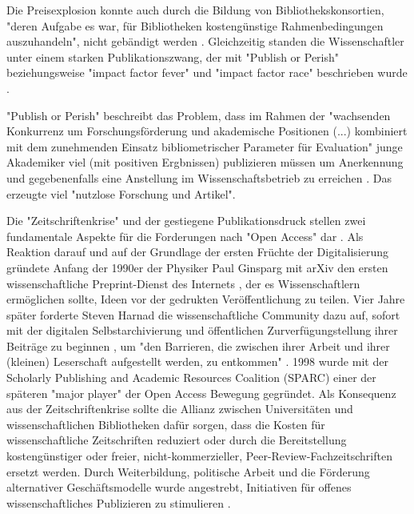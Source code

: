 Die Preisexplosion konnte auch durch die Bildung von Bibliothekskonsortien, "deren Aufgabe es war, für Bibliotheken kostengünstige Rahmenbedingungen auszuhandeln", nicht gebändigt werden \cite{Fladung_2003} \cite{Brintzinger_2010}. Gleichzeitig standen die Wissenschaftler unter einem starken Publikationszwang, der mit "Publish or Perish" \cite{CLAPHAM_2005} beziehungsweise "impact factor fever" \cite{Cherubini_2008} und "impact factor race" \cite{Brischoux_2009} beschrieben wurde \cite{offhaus_2012_institutionelle_repos}.  

"Publish or Perish" beschreibt das Problem, dass im Rahmen der "wachsenden Konkurrenz um Forschungsförderung und akademische Positionen (...) kombiniert mit dem zunehmenden Einsatz bibliometrischer Parameter für Evaluation" \cite{Fanelli_2010} junge Akademiker viel (mit positiven Ergbnissen) publizieren müssen um Anerkennung und gegebenenfalls eine Anstellung im Wissenschaftsbetrieb zu erreichen \cite{pscheida_2010_wikipedia} \cite{Beasley_2005}. Das erzeugte viel "nutzlose Forschung und Artikel"\cite{smith1990killing}.

Die "Zeitschriftenkrise" und der gestiegene Publikationsdruck stellen zwei fundamentale Aspekte für die Forderungen nach "Open Access" dar \cite{Brintzinger_2010}. Als Reaktion darauf und auf der Grundlage der ersten Früchte der Digitalisierung gründete Anfang der 1990er der Physiker Paul Ginsparg mit arXiv den ersten wissenschaftliche Preprint-Dienst des Internets \cite{suchen}, der es Wissenschaftlern ermöglichen sollte, Ideen vor der gedrukten Veröffentlichung zu teilen. Vier Jahre später forderte Steven Harnad die wissenschaftliche Community dazu auf, sofort mit der digitalen Selbstarchivierung und öffentlichen Zurverfügungstellung ihrer Beiträge zu beginnen \cite{albert_2006_open_implications}, um "den Barrieren, die zwischen ihrer Arbeit und ihrer (kleinen) Leserschaft aufgestellt werden, zu entkommen" \cite{harnad_1995_subversive_proposal}. 1998 wurde mit der Scholarly Publishing and Academic Resources Coalition (SPARC) einer der späteren "major player" der Open Access Bewegung \cite{russell2008business} \cite{Herb_2012} gegründet. Als Konsequenz aus der Zeitschriftenkrise sollte die Allianz zwischen Universitäten und wissenschaftlichen Bibliotheken dafür sorgen, dass die Kosten für wissenschaftliche Zeitschriften reduziert oder durch die Bereitstellung kostengünstiger oder freier, nicht-kommerzieller, Peer-Review-Fachzeitschriften ersetzt werden. Durch Weiterbildung, politische Arbeit und die Förderung alternativer Geschäftsmodelle wurde angestrebt, Initiativen für offenes wissenschaftliches Publizieren zu stimulieren \cite{suchen}.

